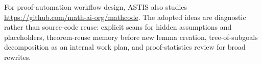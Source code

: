 For proof-automation workflow design, ASTIS also studies
\url{https://github.com/math-ai-org/mathcode}.  The adopted ideas are diagnostic rather than source-code
reuse: explicit scans for hidden assumptions and placeholders, theorem-reuse
memory before new lemma creation, tree-of-subgoals decomposition as an internal
work plan, and proof-statistics review for broad rewrites.


